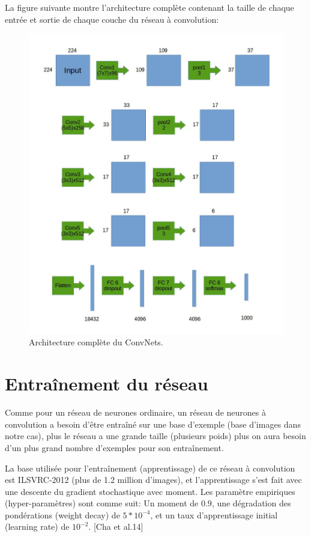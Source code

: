 	La figure suivante montre l'architecture complète contenant la taille de chaque entrée et sortie de chaque couche du réseau à convolution:

\begin{figure}[H]
	\centering
		\includegraphics[width=6in]{Figures/architectureVGG.jpg}
	\caption[An Electron]{Architecture complète du ConvNets.}
	\label{fig:Electron}
\end{figure}



\section{Entraînement du réseau}
	Comme pour un réseau de neurones ordinaire, un réseau de neurones à convolution a besoin d'être entraîné sur une base d'exemple (base d'images dans notre cas), plus le réseau a une grande taille (plusieurs poids) plus on aura besoin d'un plus grand nombre d'exemples pour son entraînement. 
	
	La base utilisée pour l’entraînement (apprentissage) de ce réseau à convolution est ILSVRC-2012 (plus de 1.2 million d'images), et l'apprentissage s'est fait avec une descente du gradient stochastique avec moment. Les paramètre empiriques (hyper-paramètres) sont comme suit: Un moment de $0.9$, une dégradation des pondérations (weight decay) de $5*10^{-4}$, et un taux d'apprentissage initial (learning rate) de $10^{-2}$. [Cha et al.14]
	
